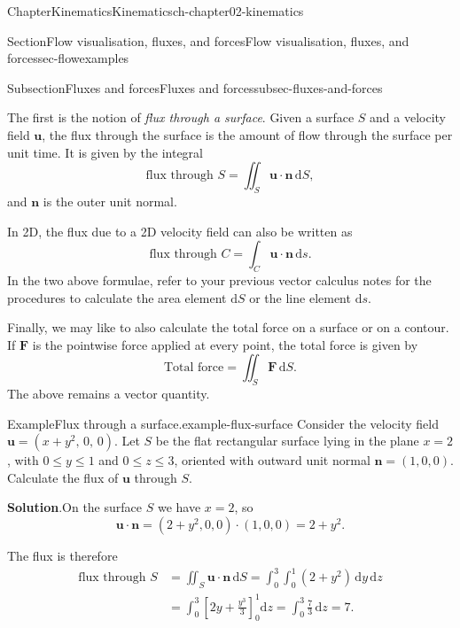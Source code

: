 \documentclass[oneside,10pt,]{book}
\newcommand{\blocktitlefont}{\relax}
\numberwithin{equation}{section}
\newcommand{\de}{\mathrm{d}}
\newcommand{\bn}{\boldsymbol{n}}
\newcommand{\bu}{\boldsymbol{u}}
\newcommand{\bF}{\boldsymbol{F}}
\newcommand{\amp}{&}
\begin{document}
\begin{chapterptx}{Chapter}{Kinematics}{}{Kinematics}{}{}{ch-chapter02-kinematics}
\begin{sectionptx}{Section}{Flow visualisation, fluxes, and forces}{}{Flow visualisation, fluxes, and forces}{}{}{sec-flowexamples}
\begin{subsectionptx}{Subsection}{Fluxes and forces}{}{Fluxes and forces}{}{}{subsec-fluxes-and-forces}
\par
The first is the notion of \emph{flux through a surface}. Given a surface \(S\) and a velocity field \(\bu\), the flux through the surface is the amount of flow through the surface per unit time. It is given by the integral%
\begin{equation}
\text{flux through $S$} = \iint_S \bu \cdot \bn \, \de{S},\label{eqn-flux}
\end{equation}
and \(\bn\) is the outer unit normal.%
\par
In 2D, the flux due to a 2D velocity field can also be written as%
\begin{equation}
\text{flux through $C$} = \int_C \bu \cdot \bn \, \de{s}.\label{eqn-2d-flux}
\end{equation}
In the two above formulae, refer to your previous vector calculus notes for the procedures to calculate the area element \(\de{S}\) or the line element \(\de{s}\).%
\par
Finally, we may like to also calculate the total force on a surface or on a contour. If \(\bF\) is the pointwise force applied at every point, the total force is given by%
\begin{equation}
\textrm{Total force} = \iint_S \bF \, \de{S}.\label{eqn-total-force}
\end{equation}
The above remains a vector quantity.%
\begin{example}{Example}{Flux through a surface.}{example-flux-surface}%
Consider the velocity field \(\bu = (x+y^2,\, 0,\, 0)\). Let \(S\) be the flat rectangular surface lying in the plane \(x=2\), with \(0\le y\le 1\) and \(0\le z\le 3\), oriented with outward unit normal \(\bn = (1,0,0)\). Calculate the flux of \(\bu\) through \(S\).%
\par\smallskip%
\noindent\textbf{\blocktitlefont Solution}.\hypertarget{example-flux-surface-3}{}\quad{}On the surface \(S\) we have \(x=2\), so%
\begin{equation*}
\bu \cdot \bn = (2+y^2, 0, 0)\cdot(1,0,0) = 2+y^2.
\end{equation*}
%
\par
The flux is therefore%
\begin{align*}
\text{flux through $S$} \amp= \iint_S \bu\cdot\bn\,\de{S}
= \int_0^3\int_0^1 (2+y^2)\,\de{y}\,\de{z}\\
\amp= \int_0^3 \left[2y+\frac{y^3}{3}\right]_0^1 \de{z}
= \int_0^3 \frac{7}{3}\,\de{z} = 7.
\end{align*}
%
\par

\end{example}
\end{subsectionptx}
\end{sectionptx}
\end{chapterptx}
\end{document}
